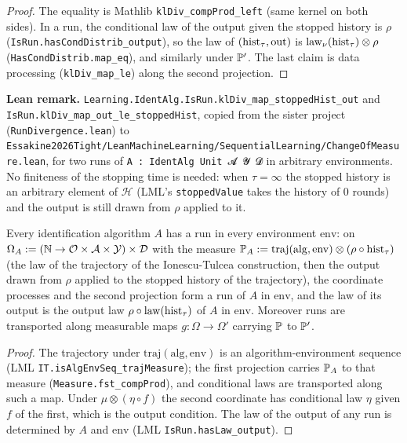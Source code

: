 \begin{proof}
\leanok
The equality is Mathlib \texttt{klDiv\_compProd\_left} (same kernel on both sides). In a run,
the conditional law of the output given the stopped history is $\rho$
(\texttt{IsRun.hasCondDistrib\_output}), so the law of $(\mathrm{hist}_\tau, \mathrm{out})$ is
$\mathrm{law}_\nu(\mathrm{hist}_\tau)\otimes\rho$ (\texttt{HasCondDistrib.map\_eq}), and similarly under
$\mathbb{P}'$. The last claim is data processing (\texttt{klDiv\_map\_le}) along the second
projection.
\end{proof}

\textbf{Lean remark.} \texttt{Learning.IdentAlg.IsRun.klDiv\_map\_stoppedHist\_out} and
\texttt{IsRun.klDiv\_map\_out\_le\_stoppedHist}, copied from the sister project
(\texttt{RunDivergence.lean}) to
\texttt{Essakine2026Tight/LeanMachineLearning/SequentialLearning/ChangeOfMeasure.lean}, for two
runs of \texttt{A : IdentAlg Unit 𝓐 𝓨 𝓓} in arbitrary environments. No finiteness of the stopping
time is needed: when $\tau = \infty$ the stopped history is an arbitrary element of $\mathcal H$
(LML's \texttt{stoppedValue} takes the history of $0$ rounds) and the output is still drawn from
$\rho$ applied to it.

\begin{lemma}\label{lem:pinfo_canonical_run}
\leanok
Every identification algorithm $A$ has a run in every environment $\mathrm{env}$: on
$\Omega_A := (\mathbb{N} \to \mathcal O \times \mathcal{A} \times \mathcal Y) \times \mathcal D$ with the measure
$\mathbb{P}_A := \mathrm{traj}(\mathrm{alg}, \mathrm{env}) \otimes (\rho \circ \mathrm{hist}_\tau)$ (the law of
the trajectory of the Ionescu-Tulcea construction, then the output drawn from $\rho$ applied to
the stopped history of the trajectory), the coordinate processes and the second projection form a
run of $A$ in $\mathrm{env}$, and the law of its output is the output law
$\rho \circ \mathrm{law}(\mathrm{hist}_\tau)$ of $A$ in $\mathrm{env}$. Moreover runs are transported along
measurable maps $g : \Omega \to \Omega'$ carrying $\mathbb{P}$ to $\mathbb{P}'$.
\end{lemma}

\begin{proof}
\leanok
The trajectory under $\mathrm{traj}(\mathrm{alg}, \mathrm{env})$ is an algorithm-environment
sequence (LML \texttt{IT.isAlgEnvSeq\_trajMeasure}); the first projection carries $\mathbb{P}_A$ to that
measure (\texttt{Measure.fst\_compProd}), and conditional laws are transported along such a map.
Under $\mu \otimes (\eta\circ f)$ the second coordinate has conditional law $\eta$ given $f$ of the
first, which is the output condition. The law of the output of any run is determined by $A$ and
$\mathrm{env}$ (LML \texttt{IsRun.hasLaw\_output}).
\end{proof}

